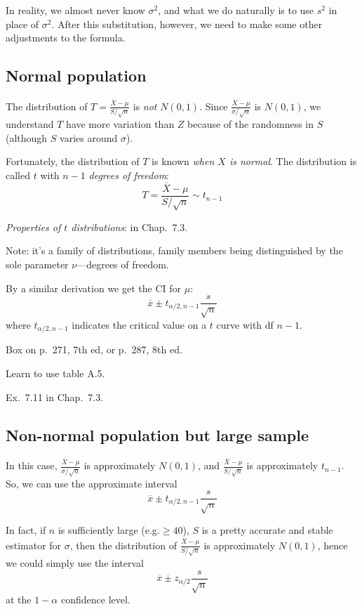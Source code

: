 \documentclass[12pt]{article}
\begin{document}
In reality, we almost never know $\sigma^2$,
and what we do naturally is to use $s^2$ in place of $\sigma^2$.
After this substitution, however,
we need to make some other adjustments to the formula.

\subsection{Normal population}

The distribution of $T = \frac{\overline{X} - \mu}{S/\sqrt{n}}$ is
\emph{not} $N(0,1)$.
Since $\frac{\overline{X} - \mu}{\sigma/\sqrt{n}}$ is $N(0,1)$,
we understand $T$ have more variation than $Z$ because of the randomness
in $S$ (although $S$ varies around $\sigma$).

Fortunately, the distribution of $T$ is known \emph{when $X$ is normal}.
The distribution is called $t$ with $n-1$ \emph{degrees of freedom}:
\[
T = \frac{\overline{X} - \mu}{S/\sqrt{n}} \sim t_{n-1}
\]

\emph{Properties of $t$ distributions}: in Chap.~7.3.

Note: it's a family of distributions, family members being distinguished
by the sole parameter $\nu$---degrees of freedom.

By a similar derivation we get the CI for $\mu$:
\[
\overline{x} \pm t_{\alpha/2,n-1} \frac{s}{\sqrt{n}}
\]
where $t_{\alpha/2,n-1}$ indicates the critical value
on a $t$ curve with df $n-1$.

Box on p.~271, 7th ed, or p.~287, 8th ed.

Learn to use table A.5.

\example Ex.~7.11 in Chap.~7.3.


\subsection{Non-normal population but large sample}

In this case,
$\frac{\overline{X} - \mu}{\sigma/\sqrt{n}}$ is approximately
$N(0,1)$, and
$\frac{\overline{X} - \mu}{S/\sqrt{n}}$ is approximately
$t_{n-1}$.
So, we can use the approximate interval
\[
\overline{x} \pm t_{\alpha/2, n-1}\frac{s}{\sqrt{n}}
\]

In fact,
if $n$ is sufficiently large (e.g.\@ $\ge 40$),
$S$ is a pretty accurate and stable estimator for $\sigma$,
then the distribution of
$\frac{\overline{X} - \mu}{S/\sqrt{n}}$ is approximately $N(0,1)$,
hence we could simply use the interval
\[
\overline{x} \pm z_{\alpha/2} \frac{s}{\sqrt{n}}
\]
at the $1-\alpha$ confidence level.
\end{document}
